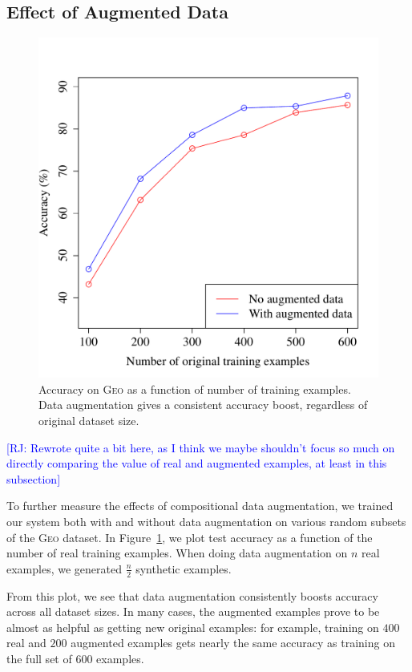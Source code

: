 \documentclass[11pt,letterpaper]{article}
\newcommand{\geo}{\textsc{Geo}\xspace}
\newcommand\rj[1]{\textcolor{blue}{[RJ: #1]}}
\begin{document}
\subsection{Effect of Augmented Data}
\begin{figure}[t] 
\small
\begin{center} 
  \includegraphics[scale=0.4]{fig-geo-augment.pdf}
\end{center} 
\caption{Accuracy on \geo as a function of number of training examples.
  Data augmentation gives a consistent accuracy boost,
regardless of original dataset size.}
\label{fig:geo-augment}
\end{figure}
\rj{Rewrote quite a bit here, as I think we maybe shouldn't
  focus so much on directly comparing the value of
real and augmented examples, at least in this subsection}

To further measure the effects of compositional data augmentation,
we trained our system both with and without data augmentation
on various random subsets of the \geo dataset.
In Figure~\ref{fig:geo-augment}, we plot test accuracy as a function of
the number of real training examples.
When doing data augmentation on $n$ real examples,
we generated $\frac{n}2$ synthetic examples.

From this plot, we see that data augmentation consistently boosts accuracy
across all dataset sizes.
In many cases, the augmented examples prove to be
almost as helpful as getting new original examples:
for example, training on $400$ real and $200$ augmented examples
gets nearly the same accuracy as training on the full set of $600$ examples.
\end{document}
